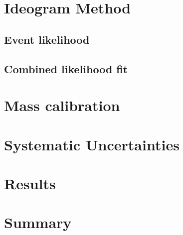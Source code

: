 \section{Ideogram Method}
\label{s_top_mass:ideogram_method}

\subsection{Event likelihood}
\label{ss_top_mass:event_likelihood}

\subsection{Combined likelihood fit}
\label{ss_top_mass:likelihood_fit}

\section{Mass calibration}
\label{s_top_mass:calibration}

\section{Systematic Uncertainties}
\label{s_top_mass:systematics}

\section{Results}
\label{s_top_mass:results}

\section{Summary}
\label{s_top_mass:summary}





